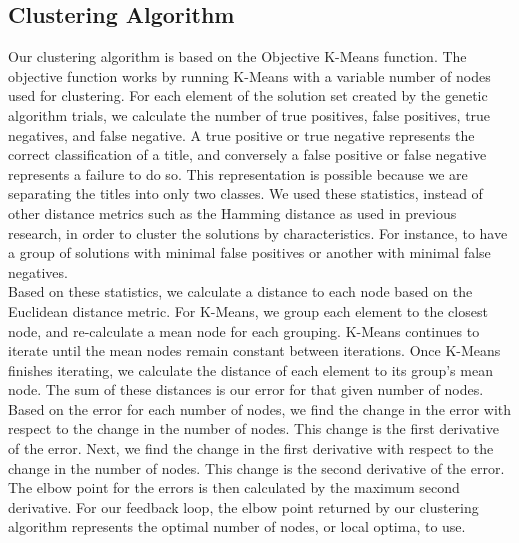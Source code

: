 \documentclass{sig-alternate}
\begin{document}
\subsection{Clustering Algorithm}
Our clustering algorithm is based on the Objective K-Means function. The objective function works by running K-Means with a variable number of nodes used for clustering. For each element of the solution set created by the genetic algorithm trials, we calculate the number of true positives, false positives, true negatives, and false negative. A true positive or true negative represents the correct classification of a title, and conversely a false positive or false negative represents a failure to do so. This representation is possible because we are separating the titles into only two classes. We used these statistics, instead of other distance metrics such as the Hamming distance as used in previous research\cite{ole:feedback}, in order to cluster the solutions by characteristics. For instance, to have a group of solutions with minimal false positives or another with minimal false negatives.\\
\indent Based on these statistics, we calculate a distance to each node based on the Euclidean distance metric. For K-Means, we group each element to the closest node, and re-calculate a mean node for each grouping. K-Means continues to iterate until the mean nodes remain constant between iterations. Once K-Means finishes iterating, we calculate the distance of each element to its group's mean node. The sum of these distances is our error for that given number of nodes.\\
\indent Based on the error for each number of nodes, we find the change in the error with respect to the change in the number of nodes. This change is the first derivative of the error. Next, we find the change in the first derivative with respect to the change in the number of nodes. This change is the second derivative of the error. The elbow point for the errors is then calculated by the maximum second derivative. For our feedback loop, the elbow point returned by our clustering algorithm represents the optimal number of nodes, or local optima, to use.
\end{document}
